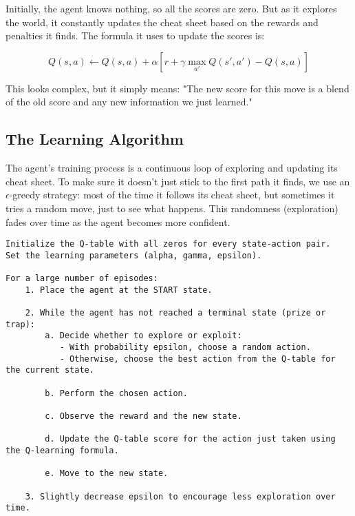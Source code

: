 \documentclass[11pt, a4paper]{article}
\begin{document}
Initially, the agent knows nothing, so all the scores are zero. But as it explores the world, it constantly updates the cheat sheet based on the rewards and penalties it finds. The formula it uses to update the scores is:

\begin{equation}
Q(s, a) \leftarrow Q(s, a) + \alpha [r + \gamma \max_{a'} Q(s', a') - Q(s, a)]
\end{equation}

This looks complex, but it simply means: "The new score for this move is a blend of the old score and any new information we just learned."

\subsection{The Learning Algorithm}
The agent's training process is a continuous loop of exploring and updating its cheat sheet. To make sure it doesn't just stick to the first path it finds, we use an $\epsilon$-greedy strategy: most of the time it follows its cheat sheet, but sometimes it tries a random move, just to see what happens. This randomness (exploration) fades over time as the agent becomes more confident.

\begin{center}
\begin{BVerbatim}[frame=single, label=Algorithm Pseudocode]
Initialize the Q-table with all zeros for every state-action pair.
Set the learning parameters (alpha, gamma, epsilon).

For a large number of episodes:
    1. Place the agent at the START state.

    2. While the agent has not reached a terminal state (prize or trap):
        a. Decide whether to explore or exploit:
           - With probability epsilon, choose a random action.
           - Otherwise, choose the best action from the Q-table for the current state.

        b. Perform the chosen action.
        
        c. Observe the reward and the new state.
        
        d. Update the Q-table score for the action just taken using the Q-learning formula.
        
        e. Move to the new state.

    3. Slightly decrease epsilon to encourage less exploration over time.
\end{BVerbatim}
\end{center}
\end{document}
